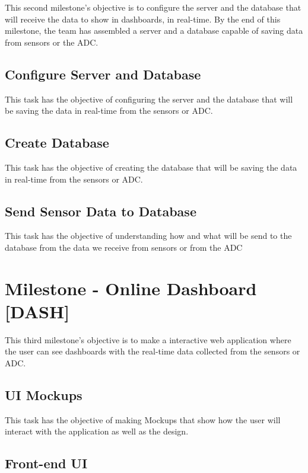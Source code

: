 \documentclass[a4paper, 11pt]{report}
\begin{document}
This second milestone's objective is to configure the server and the database that will receive the data to show in dashboards, in real-time. By the end of this milestone, the team has assembled a server and a database capable of saving data from sensors or the ADC.

\subsection{Configure Server and Database}

This task has the objective of configuring the server and the database that will be saving the data in real-time from the sensors or ADC.

\subsection{Create Database}

This task has the objective of creating the database that will be saving the data in real-time from the sensors or ADC.

\subsection{Send Sensor Data to Database}

This task has the objective of understanding how and what will be send to the database from the data we receive from sensors or from the ADC

\section{Milestone - Online Dashboard [DASH]}

This third milestone's objective is to make a interactive web application where the user can see dashboards with the real-time data collected from the sensors or ADC.

\subsection{UI Mockups}

This task has the objective of making Mockups that show how the user will interact with the application as well as the design.

\subsection{Front-end UI}
\end{document}
